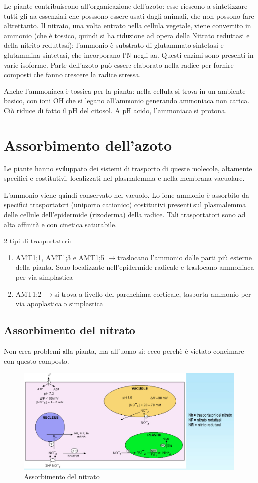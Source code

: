 \documentclass[a4paper,12pt]{book}
\newcommand{\lfreccia}{\ensuremath{\longrightarrow}}
\begin{document}
Le piante contribuiscono all'organicazione dell'azoto: esse riescono a sintetizzare tutti gli aa essenziali che posssono essere usati dagli animali, che non possono fare altrettanto.
Il nitrato, una volta entrato nella cellula vegetale, viene convertito in ammonio (che è tossico, quindi si ha riduzione ad opera della Nitrato reduttasi e della nitrito reduttasi); l'ammonio è substrato di glutammato sintetasi e glutammina sintetasi, che incorporano l'N negli aa.
Questi enzimi sono presenti in varie isoforme. Parte dell'azoto può essere elaborato  nella radice per fornire composti che fanno crescere la radice stressa.

Anche l'ammoniaca è tossica per la pianta: nella cellula si trova in un ambiente basico, con ioni OH che si legano all'ammonio generando ammoniaca non carica. Ciò riduce di fatto il pH del citosol. A pH acido, l'ammoniaca si protona. 
\section{Assorbimento dell'azoto}
Le piante hanno sviluppato dei sistemi di trasporto di queste molecole, altamente specifici e costitutivi, localizzati nel plasmalemma e nella membrana vacuolare. 

L'ammonio viene quindi conservato nel vacuolo. Lo ione ammonio è assorbito da specifici trasportatori (uniporto cationico) costitutivi presenti sul plasmalemma delle cellule dell’epidermide (rizoderma) della radice. Tali trasportatori sono ad alta affinità e con cinetica saturabile.

2 tipi di trasportatori:
\begin{enumerate}
\item{AMT1;1, AMT1;3 e AMT1;5 \lfreccia traslocano l'ammonio dalle parti più esterne della pianta. Sono localizzate nell'epidermide radicale e traslocano ammoniaca per via simplastica}
\item{AMT1;2 \lfreccia si trova a livello del parenchima corticale, tasporta ammonio per via apoplastica o simplastica}
\end{enumerate}
 
\subsection{Assorbimento del nitrato}
Non crea problemi alla pianta, ma all'uomo si: ecco perchè è vietato concimare con questo composto.
\begin{figure}[H]
\centering
\includegraphics[scale=0.4]{immagini/nitrato.jpg}
\caption{Assorbimento del nitrato}
\end{figure}
 
\end{document}
